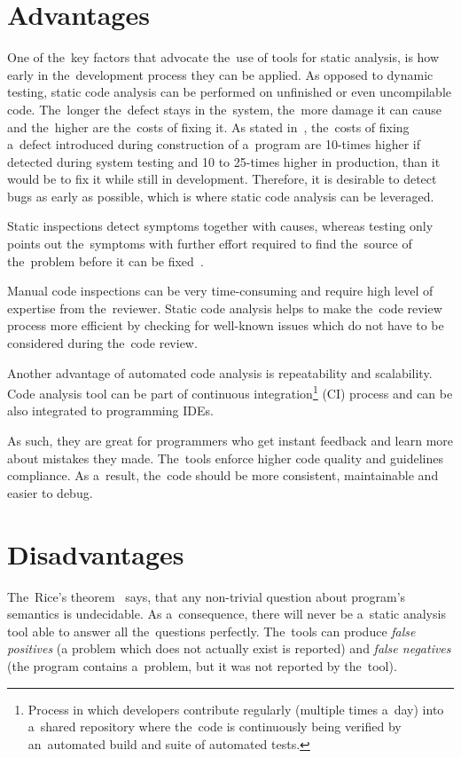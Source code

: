 \documentclass[
  digital, %
  table,   %
  lof,     %
  lot,     %
  oneside,
]{fithesis3}
\begin{document}
\section{Advantages}
One of the~key factors that advocate the~use of tools for static analysis, is how early in the~development process they can be applied. As opposed to dynamic testing, static code analysis can be performed on unfinished or even uncompilable code. The~longer the~defect stays in the~system, the~more damage it can cause and the~higher are the~costs of fixing it. As stated in~\cite[p. 29]{code-complete}, the~costs of fixing a~defect introduced during construction of a~program are 10-times higher if detected during system testing and 10 to 25-times higher in production, than it would be to fix it while still in development. Therefore, it is desirable to detect bugs as early as possible, which is where static code analysis can be leveraged.

Static inspections detect symptoms together with causes, whereas testing only points out the~symptoms with further effort required to find the~source of the~problem before it can be fixed~\cite[p. 472]{code-complete}.

Manual code inspections can be very time-consuming and require high level of expertise from the~reviewer. Static code analysis helps to make the~code review process more efficient by checking for well-known issues which do not have to be considered during the~code review.

Another advantage of automated code analysis is repeatability and scalability. Code analysis tool can be part of continuous integration\footnote{Process in which developers contribute regularly (multiple times a~day) into a~shared repository where the~code is continuously being verified by an~automated build and suite of automated tests.} (CI) process and can be also integrated to programming IDEs.

As such, they are great for programmers who get instant feedback and learn more about mistakes they made. The~tools enforce higher code quality and guidelines compliance. As a~result, the~code should be more consistent, maintainable and easier to debug.
  
\section{Disadvantages}
The~Rice's theorem~\cite{direct-proofs-of-rices-theorem} says, that any non-trivial question about program's semantics is undecidable. As a~consequence, there will never be a~static analysis tool able to answer all the~questions perfectly. The~tools can produce \textit{false positives} (a problem which does not actually exist is reported) and \textit{false negatives} (the program contains a~problem, but it was not reported by the~tool).
\end{document}
